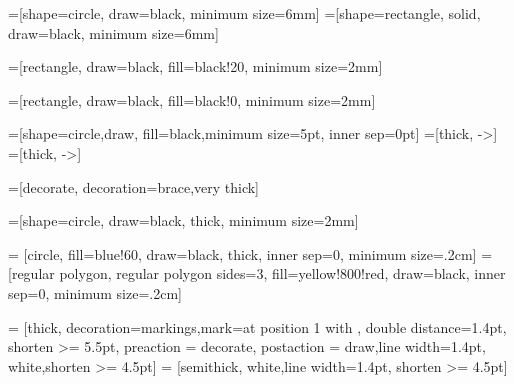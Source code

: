 \usepackage{tikz}
\usepackage{pgf}
\usetikzlibrary{positioning}
\usetikzlibrary{shadows,shapes,arrows}
\usetikzlibrary{calc,3d}
\usetikzlibrary{fit}
\usetikzlibrary{decorations.pathmorphing}
\usetikzlibrary{trees} 


\pgfarrowsdeclare{:}{:}{}{}

=[shape=circle, draw=black, minimum size=6mm]
=[shape=rectangle, solid, draw=black, minimum size=6mm]


=[rectangle, draw=black, fill=black!20, minimum size=2mm]

=[rectangle, draw=black, fill=black!0, minimum size=2mm]

=[shape=circle,draw, fill=black,minimum size=5pt, inner sep=0pt]
=[thick, ->]
=[thick, ->]

=[decorate, decoration=brace,very thick] 

=[shape=circle, draw=black, thick, minimum size=2mm]


 = [circle, fill=blue!60, draw=black, thick, inner sep=0, minimum size=.2cm]
 = [regular polygon, regular polygon sides=3, fill=yellow!800!red, draw=black, inner sep=0, minimum size=.2cm]

 = [thick, decoration={markings,mark=at position
   1 with {}},
   double distance=1.4pt, shorten >= 5.5pt,
   preaction = {decorate},
   postaction = {draw,line width=1.4pt, white,shorten >= 4.5pt}]
 = [semithick, white,line width=1.4pt, shorten >= 4.5pt]


